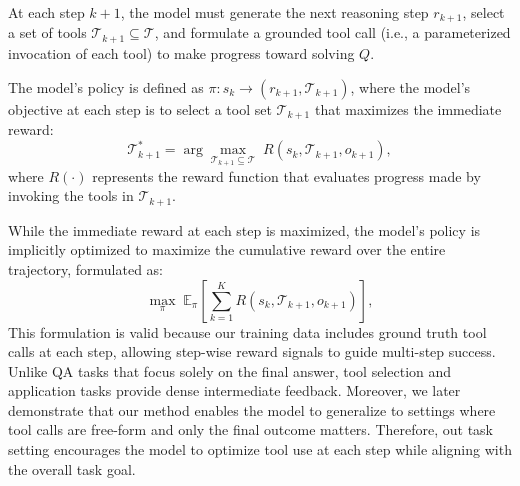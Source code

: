 At each step \( k+1 \), the model must generate the next reasoning step \( r_{k+1} \), select a set of tools \( \mathcal{T}_{k+1} \subseteq \mathcal{T} \), and formulate a grounded tool call (i.e., a parameterized invocation of each tool) to make progress toward solving \( Q \).

The model's policy is defined as \( \pi: s_k \to \left( r_{k+1}, \mathcal{T}_{k+1} \right) \), where the model's objective at each step is to select a tool set \( \mathcal{T}_{k+1} \) that maximizes the immediate reward:
\[
\mathcal{T}_{k+1}^* = \arg\max_{\mathcal{T}_{k+1} \subseteq \mathcal{T}} \; R(s_k, \mathcal{T}_{k+1}, o_{k+1}),
\]
where \( R(\cdot) \) represents the reward function that evaluates progress made by invoking the tools in \( \mathcal{T}_{k+1} \).

While the immediate reward at each step is maximized, the model's policy is implicitly optimized to maximize the cumulative reward over the entire trajectory, formulated as:
\[
\max_\pi \; \mathbb{E}_{\pi} \left[ \sum_{k=1}^{K} R(s_k, \mathcal{T}_{k+1}, o_{k+1}) \right],
\]
This formulation is valid because our training data includes ground truth tool calls at each step, allowing step-wise reward signals to guide multi-step success. Unlike QA tasks that focus solely on the final answer, tool selection and application tasks provide dense intermediate feedback. Moreover, we later demonstrate that our method enables the model to generalize to settings where tool calls are free-form and only the final outcome matters. Therefore, out task setting encourages the model to optimize tool use at each step while aligning with the overall task goal.



